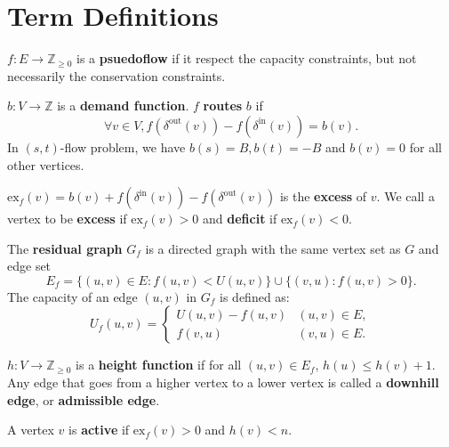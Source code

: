 \section{Term Definitions}

\begin{definition}[Psuedoflow]
  $f: E \to \mathbb{Z}_{\geq 0}$ is a \textbf{psuedoflow} if it respect the capacity constraints, but not necessarily the conservation constraints.
\end{definition}

\begin{definition}
  $b: V \to \mathbb{Z}$ is a \textbf{demand function}.
  $f$ \textbf{routes} $b$ if
  \[ \forall v \in V, f(\delta^{\text{out}}(v)) - f(\delta^{\text{in}}(v)) = b(v). \]
  In $(s,t)$-flow problem, we have $b(s) = B, b(t) = -B$ and $b(v) = 0$ for all other vertices.
\end{definition}

\begin{definition}[Excess]
  $\text{ex}_f(v) = b(v) + f(\delta^{\text{in}}(v)) - f(\delta^{\text{out}}(v))$ is the \textbf{excess} of $v$.
  We call a vertex to be \textbf{excess} if $\text{ex}_f(v) > 0$ and \textbf{deficit} if $\text{ex}_f(v) < 0$.
\end{definition}

\begin{definition}
  The \textbf{residual graph} $G_f$ is a directed graph with the same vertex set as $G$ and edge set
  \[ E_f = \{(u,v) \in E: f(u,v) < U(u,v)\} \cup \{(v,u): f(u,v) > 0\}. \]
  The capacity of an edge $(u,v)$ in $G_f$ is defined as:
  \[ U_f(u,v) = \begin{cases}
    U(u,v) - f(u,v) & (u,v) \in E,\\
    f(v,u) & (v,u) \in E.
  \end{cases} \]
\end{definition}

\begin{definition}
  $h: V \to \mathbb{Z}_{\geq 0}$ is a \textbf{height function} if for all $(u,v) \in E_f$, $h(u) \leq h(v) + 1$.
  Any edge that goes from a higher vertex to a lower vertex is called a \textbf{downhill edge}, or \textbf{admissible edge}.
\end{definition}

\begin{definition}
  A vertex $v$ is \textbf{active} if $\text{ex}_f(v) > 0$ and $h(v)<n$.
\end{definition}

